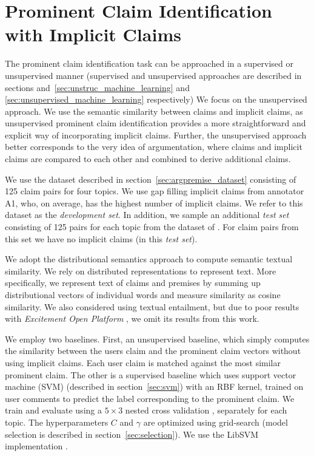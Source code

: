 \section{Prominent Claim Identification with Implicit Claims}
\label{sec:argpremise_identification}

The prominent claim identification task can be approached in a supervised or
unsupervised manner (supervised and unsupervised approaches are described in 
sections and~\ref{sec:unstruc_machine_learning} and
\ref{sec:unsupervised_machine_learning} respectively)
We focus on the unsupervised approach. 
We use the semantic similarity between claims and implicit claims, as
unsupervised prominent claim identification provides a more straightforward and
explicit way of incorporating implicit claims. 
Further, the unsupervised approach better corresponds to the very idea of
argumentation, 
where claims and implicit claims are compared to each other and combined to 
derive additional claims. 

We use the dataset described in section~\ref{sec:argpremise_dataset} 
consisting of 125 claim pairs for four topics. 
We use gap filling implicit claims from annotator A1, who, on average, has the
highest number of implicit claims. 
We refer to this dataset as the \emph{development set}.
In addition, we sample an additional \emph{test set} consisting of 125 pairs for each topic
from the dataset of \citet{hasan2014you}. 
For claim pairs from this set we have no
implicit claims (in this \emph{test set}). 

We adopt the distributional semantics approach to compute semantic textual similarity. 
We rely on distributed representations \citep{mikolov2013distributed} to represent text. 
More specifically, we represent text of claims and premises by summing up distributional
vectors of individual words and measure similarity as cosine similarity. 
We also considered using textual entailment,
but due to poor results with \textit{Excitement Open Platform}
\citep{pado2015design}, we omit its results from this work. 

We employ two baselines.  First, an unsupervised baseline, which simply
computes the similarity between the users claim and the prominent claim vectors
without using implicit claims. 
Each user claim is matched against the most similar prominent claim. 
The other is a supervised baseline which uses support vector machine (SVM)
(described in section~\ref{sec:svm}) with an RBF kernel, trained 
on user comments to predict the label corresponding to the 
prominent claim. 
We train and evaluate using a $5 \times 3$ nested cross validation , separately for each topic. 
The hyperparameters $C$ and $\gamma$ are optimized using grid-search
(model selection is described in section~\ref{sec:selection}). 
We use the LibSVM implementation \citep{chang2011libsvm}. 

